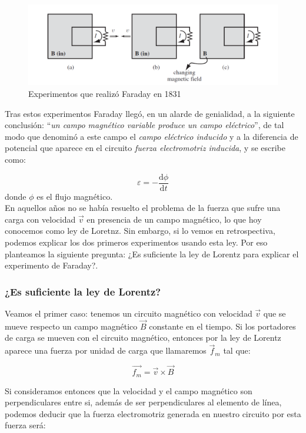 \documentclass[12pt]{article}
\newcommand{\D}{\mathrm{d}}
\begin{document}
\begin{figure}[h!] \centering
\includegraphics[scale=0.7]{figura-griffiths-7.21.png}
\caption{Experimentos que realizó Faraday en 1831}
\end{figure}

Tras estos experimentos Faraday llegó, en un alarde de genialidad, a la siguiente conclusión: ``\textit{un campo magnético variable produce un campo eléctrico}'', de tal modo que denominó a este campo el \textit{campo eléctrico inducido} y a la diferencia de potencial que aparece en el circuito \textit{fuerza electromotriz inducida}, y se escribe como:

\begin{equation}
\varepsilon = - \dfrac{\D \phi}{\D t}
\end{equation}
donde $\phi$ es el flujo magnético.\\

En aquellos años no se había resuelto el problema de la fuerza que sufre una carga con velocidad $\vec{v}$ en presencia de un campo magnético, lo que hoy conocemos como ley de Loretnz. Sin embargo, si lo vemos en retrospectiva, podemos explicar los dos primeros experimentos usando esta ley. Por eso planteamos la siguiente pregunta: ¿Es suficiente la ley de Lorentz para explicar el experimento de Faraday?.

\subsubsection{¿Es suficiente la ley de Lorentz?}

Veamos el primer caso: tenemos un circuito magnético con velocidad $\vec{v}$ que se mueve respecto un campo magnético $\vec{B}$ constante en el tiempo. Si los portadores de carga se mueven con el circuito magnético, entonces por la ley de Lorentz aparece una fuerza por unidad de carga que llamaremos $\vec{f}_m$ tal que:

$$
\vec{f_m} = \vec{v} \times \vec{B}
$$

Si consideramos entonces que la velocidad y el campo magnético son perpendiculares entre si, además de ser perpendiculares al elemento de línea, podemos deducir que la fuerza electromotriz generada en nuestro circuito por esta fuerza será:
\end{document}
